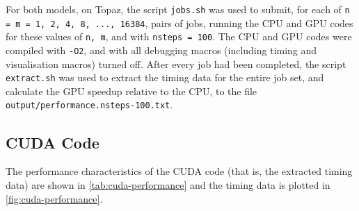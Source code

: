 \documentclass{article}
\newcommand{\lilf}[1]{\lstinline[style=ff]{#1}}
\begin{document}
For both models, on Topaz, the script \lilf{jobs.sh} was used to submit, for
each of \lstinline{n = m = 1, 2, 4, 8, ..., 16384}, pairs of jobs, running the
CPU and GPU codes for these values of \lstinline{n, m}, and with
\lstinline{nsteps = 100}.
The CPU and GPU codes were compiled with \lstinline{-O2}, and with all debugging
macros (including timing and visualisation macros) turned off.
After every job had been completed, the script \lilf{extract.sh} was used to
extract the timing data for the entire job set, and calculate the GPU speedup
relative to the CPU, to the file \lilf{output/performance.nsteps-100.txt}.

\subsection{CUDA Code}
\label{sec:cuda-code}

The performance characteristics of the CUDA code (that is, the extracted timing
data) are shown in \autoref{tab:cuda-performance} and the timing data is plotted
in \autoref{fig:cuda-performance}.

\begin{table}[h]
  \begin{center}
  \end{center}
  \caption{
    Performance characteristics of CUDA code, compiled with
    \lstinline[language=bash]{-02}, and with debugging statements turned off.
    All times are presented in units of \si{\ms}.
  }
  \label{tab:cuda-performance}
\end{table}
\end{document}
